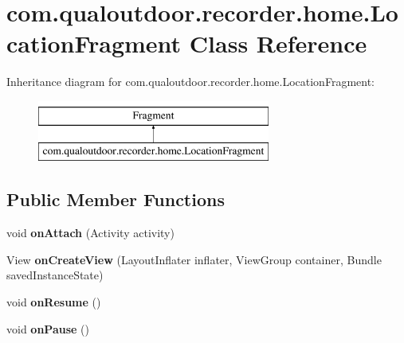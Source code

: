\hypertarget{classcom_1_1qualoutdoor_1_1recorder_1_1home_1_1LocationFragment}{\section{com.\-qualoutdoor.\-recorder.\-home.\-Location\-Fragment Class Reference}
\label{classcom_1_1qualoutdoor_1_1recorder_1_1home_1_1LocationFragment}
}
Inheritance diagram for com.\-qualoutdoor.\-recorder.\-home.\-Location\-Fragment\-:\begin{figure}[H]
\begin{center}
\leavevmode
\includegraphics[height=2.000000cm]{classcom_1_1qualoutdoor_1_1recorder_1_1home_1_1LocationFragment}
\end{center}
\end{figure}
\subsection*{Public Member Functions}
\begin{DoxyCompactItemize}
\item 
\hypertarget{classcom_1_1qualoutdoor_1_1recorder_1_1home_1_1LocationFragment_aa87703c32b2d5f9d5f6d3b1d5c58770d}{void {\bfseries on\-Attach} (Activity activity)}\label{classcom_1_1qualoutdoor_1_1recorder_1_1home_1_1LocationFragment_aa87703c32b2d5f9d5f6d3b1d5c58770d}

\item 
\hypertarget{classcom_1_1qualoutdoor_1_1recorder_1_1home_1_1LocationFragment_a13b521cbf2c5f68ab59d17887aa02a01}{View {\bfseries on\-Create\-View} (Layout\-Inflater inflater, View\-Group container, Bundle saved\-Instance\-State)}\label{classcom_1_1qualoutdoor_1_1recorder_1_1home_1_1LocationFragment_a13b521cbf2c5f68ab59d17887aa02a01}

\item 
\hypertarget{classcom_1_1qualoutdoor_1_1recorder_1_1home_1_1LocationFragment_aa3c26d451dfbc4269cac84d54d6b456c}{void {\bfseries on\-Resume} ()}\label{classcom_1_1qualoutdoor_1_1recorder_1_1home_1_1LocationFragment_aa3c26d451dfbc4269cac84d54d6b456c}

\item 
\hypertarget{classcom_1_1qualoutdoor_1_1recorder_1_1home_1_1LocationFragment_a06e1ac7aa12f5307c20576749eb77b67}{void {\bfseries on\-Pause} ()}\label{classcom_1_1qualoutdoor_1_1recorder_1_1home_1_1LocationFragment_a06e1ac7aa12f5307c20576749eb77b67}

\end{DoxyCompactItemize}
